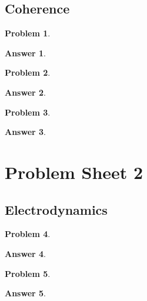 \documentclass[a4paper]{article}
\newtheorem{ans}{Answer}[section]
\theoremstyle{new}
\newtheorem{qns}{Problem}[section]
\begin{document}
\subsection*{Coherence}
\begin{qns}

\end{qns}
\begin{ans}

\end{ans}
\begin{qns}

\end{qns}
\begin{ans}

\end{ans}
\begin{qns}

\end{qns}
\begin{ans}

\end{ans}
\newpage
\section{Problem Sheet 2}
\subsection*{Electrodynamics}
\begin{qns}

\end{qns}
\begin{ans}

\end{ans}
\begin{qns}

\end{qns}
\begin{ans}

\end{ans}
\newpage
\end{document}
